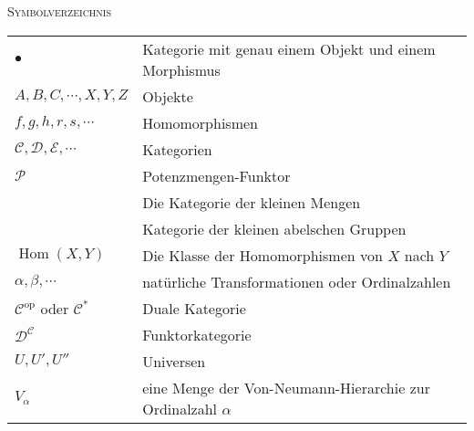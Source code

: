 \documentclass[a4paper]{amsart}
\theoremstyle{definition}
\DeclareMathOperator{\Hom}{Hom}
\newcommand{\CC}{\ensuremath{\mathcal{ C }}}
\newcommand{\DD}{\ensuremath{\mathcal{ D }}}
\newcommand{\PP}{\ensuremath{\mathcal{ P }}}
\newcommand{\Set}{\text{\textbf{Set}}}
\newcommand{\Ab}{\text{\textbf{Ab}}}
\begin{document}
\begin{large}
    \centerline{\textsc{Symbolverzeichnis}}
\end{large}
\bigskip

\renewcommand*{\arraystretch}{1}

\begin{tabular}{ll}
    $\bullet$                           & Kategorie mit genau einem Objekt und einem Morphismus\\
    $A, B, C, \cdots, X, Y, Z$          & Objekte\\
    $f, g, h, r, s, \cdots$             & Homomorphismen\\
    $\mathcal C, \mathcal D, \mathcal E, \cdots$ & Kategorien\\
    $\PP$                               & Potenzmengen-Funktor\\
    \Set                                & Die Kategorie der kleinen Mengen\\
    \Ab                                 & Kategorie der kleinen abelschen Gruppen\\
    $\Hom( X, Y)$                       & Die Klasse der Homomorphismen von $X$ nach $Y$\\
    $\alpha, \beta, \cdots$             & natürliche Transformationen oder Ordinalzahlen\\
    $\mathcal C ^{\text{op}}$ oder $\mathcal C ^{*}$         & Duale Kategorie\\
    $\DD^\CC$                           & Funktorkategorie\\
    $U, U', U''$                        & Universen\\
    $V_\alpha$                          & eine Menge der Von-Neumann-Hierarchie zur Ordinalzahl
                                          $\alpha$

\end{tabular}
\end{document}
